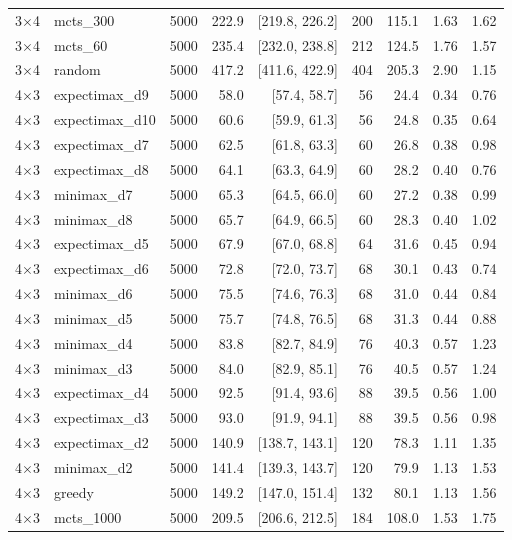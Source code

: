 {\begin{longtable}{llrrrrrrr}
3$\times$4 & mcts\_300 & 5000 & 222.9 & [219.8, 226.2] & 200 & 115.1 & 1.63 & 1.62 \\
3$\times$4 & mcts\_60 & 5000 & 235.4 & [232.0, 238.8] & 212 & 124.5 & 1.76 & 1.57 \\
3$\times$4 & random & 5000 & 417.2 & [411.6, 422.9] & 404 & 205.3 & 2.90 & 1.15 \\
\midrule
4$\times$3 & expectimax\_d9 & 5000 & 58.0 & [57.4, 58.7] & 56 & 24.4 & 0.34 & 0.76 \\
4$\times$3 & expectimax\_d10 & 5000 & 60.6 & [59.9, 61.3] & 56 & 24.8 & 0.35 & 0.64 \\
4$\times$3 & expectimax\_d7 & 5000 & 62.5 & [61.8, 63.3] & 60 & 26.8 & 0.38 & 0.98 \\
4$\times$3 & expectimax\_d8 & 5000 & 64.1 & [63.3, 64.9] & 60 & 28.2 & 0.40 & 0.76 \\
4$\times$3 & minimax\_d7 & 5000 & 65.3 & [64.5, 66.0] & 60 & 27.2 & 0.38 & 0.99 \\
4$\times$3 & minimax\_d8 & 5000 & 65.7 & [64.9, 66.5] & 60 & 28.3 & 0.40 & 1.02 \\
4$\times$3 & expectimax\_d5 & 5000 & 67.9 & [67.0, 68.8] & 64 & 31.6 & 0.45 & 0.94 \\
4$\times$3 & expectimax\_d6 & 5000 & 72.8 & [72.0, 73.7] & 68 & 30.1 & 0.43 & 0.74 \\
4$\times$3 & minimax\_d6 & 5000 & 75.5 & [74.6, 76.3] & 68 & 31.0 & 0.44 & 0.84 \\
4$\times$3 & minimax\_d5 & 5000 & 75.7 & [74.8, 76.5] & 68 & 31.3 & 0.44 & 0.88 \\
4$\times$3 & minimax\_d4 & 5000 & 83.8 & [82.7, 84.9] & 76 & 40.3 & 0.57 & 1.23 \\
4$\times$3 & minimax\_d3 & 5000 & 84.0 & [82.9, 85.1] & 76 & 40.5 & 0.57 & 1.24 \\
4$\times$3 & expectimax\_d4 & 5000 & 92.5 & [91.4, 93.6] & 88 & 39.5 & 0.56 & 1.00 \\
4$\times$3 & expectimax\_d3 & 5000 & 93.0 & [91.9, 94.1] & 88 & 39.5 & 0.56 & 0.98 \\
4$\times$3 & expectimax\_d2 & 5000 & 140.9 & [138.7, 143.1] & 120 & 78.3 & 1.11 & 1.35 \\
4$\times$3 & minimax\_d2 & 5000 & 141.4 & [139.3, 143.7] & 120 & 79.9 & 1.13 & 1.53 \\
4$\times$3 & greedy & 5000 & 149.2 & [147.0, 151.4] & 132 & 80.1 & 1.13 & 1.56 \\
4$\times$3 & mcts\_1000 & 5000 & 209.5 & [206.6, 212.5] & 184 & 108.0 & 1.53 & 1.75 \\

\end{longtable}}
